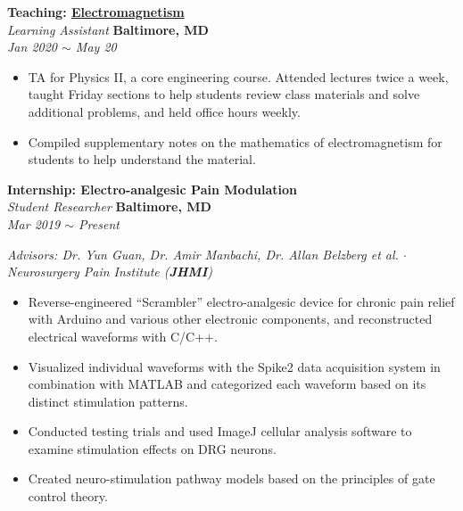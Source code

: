 \documentclass[10pt, letterpaper]{article}
\begin{document}
\begin{paracol}{2}
	\textbf{Teaching: \href{https://github.com/chenyi00/physics-2}{Electromagnetism}}\\
	\textit{Learning Assistant}
	\switchcolumn
	\raggedleft\textbf{Baltimore, MD}\\
	\raggedleft\textit{Jan 2020 $\sim$ May 20}
\end{paracol}\vspace{-1mm}
\vspace{-2mm}
\begin{itemize}
	\item TA for Physics II, a core engineering course. Attended lectures twice a week, taught Friday sections to help students review class materials and solve additional problems, and held office hours weekly.
	\vspace{-3mm}
	\item Compiled supplementary notes on the mathematics of electromagnetism for students to help understand the material.
\end{itemize}
\vspace{-2mm}


\begin{paracol}{2}
	\textbf{Internship: Electro-analgesic Pain Modulation}\\
	\textit{Student Researcher}
	\switchcolumn \hfill
	\raggedleft\textbf{Baltimore, MD}\\
	\raggedleft\textit{Mar 2019 $\sim$ Present}
\end{paracol}\vspace{-1mm}
\textit{Advisors: Dr. Yun Guan, Dr. Amir Manbachi, Dr. Allan Belzberg et al. $\cdot$ Neurosurgery
Pain Institute (\textbf{JHMI})}
\vspace{-3mm}
\begin{itemize}
	\item Reverse-engineered ``Scrambler'' electro-analgesic device for chronic pain relief with 
	Arduino and various other electronic components, and reconstructed electrical waveforms 
	with C/C++.
	\vspace{-3mm}
	\item Visualized individual waveforms with the Spike2 data acquisition system in combination 
	with MATLAB and categorized each waveform based on its distinct stimulation patterns.
	\vspace{-3mm}
	\item Conducted testing trials and used ImageJ cellular analysis software to examine stimulation effects on DRG neurons.
	\vspace{-3mm}
	\item Created neuro-stimulation pathway models based on the principles of gate control theory.
\end{itemize}
\vspace{-2mm} 
\end{document}
